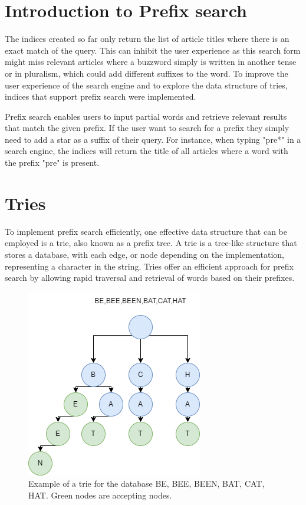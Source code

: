 \section{Introduction to Prefix search}
The indices created so far only return the list of article titles where there is an exact match of the query. This can inhibit the user experience as this search form might miss relevant articles where a buzzword simply is written in another tense or in  pluralism, which could add different suffixes to the word. To improve the user experience of the search engine and to explore the data structure of tries, indices that support prefix search were implemented.

Prefix search enables users to input partial words and retrieve relevant results that match the given prefix. If the user want to search for a prefix they simply need to add a star as a suffix of their query. For instance, when typing "pre*" in a search engine, the indices will return the title of all articles where a word with the prefix "pre" is present. 

\section{Tries}
To implement prefix search efficiently, one effective data structure that can be employed is a trie, also known as a prefix tree. A trie is a tree-like structure that stores a database, with each edge, or node depending on the implementation, representing a character in the string. Tries offer an efficient approach for prefix search by allowing rapid traversal and retrieval
of words based on their prefixes.

\begin{figure}[b!]
    \centering
    \includegraphics[width=.5\textwidth]{LaTeX/Figures/Tries/trie.png}
    \caption{Example of a trie for the database BE, BEE, BEEN, BAT, CAT, HAT. Green nodes are accepting nodes. }
    \label{fig:trie-st-example}
\end{figure}


